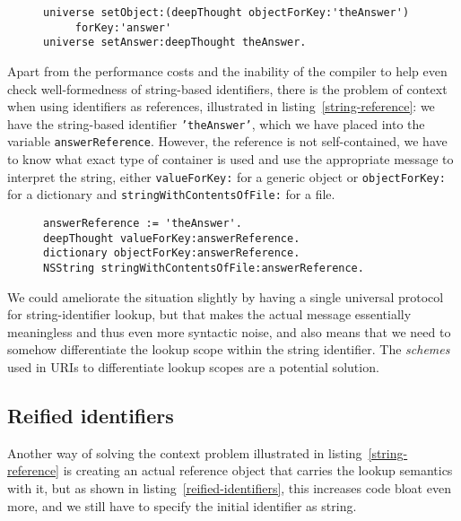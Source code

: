 \documentclass[preprint,authoryear]{acm_proc_article-sp}
\begin{document}
\begin{figure}[htbp]
\begin{lstlisting}[style=numbers,label=string-bloat,caption=Bloat with keyed access.]
universe setObject:(deepThought objectForKey:'theAnswer')
	 forKey:'answer'
universe setAnswer:deepThought theAnswer.
\end{lstlisting}
\end{figure}

Apart from the performance costs and the inability of the compiler to help
even check well-formedness of string-based identifiers, there is the problem
of context when using identifiers as references, illustrated in listing~\ref{string-reference}:
we have the string-based identifier {\tt 'theAnswer'}, which we have placed into the
variable {\tt answerReference}.   However, the reference is not self-contained, we
have to know what exact type of container is used and use the appropriate message
to interpret the string, either {\tt valueForKey:} for a generic object or {\tt objectForKey:}
for a dictionary and {\tt stringWithContentsOfFile:} for a file.


\begin{figure}[htbp]
\begin{lstlisting}[style=numbers,label=string-reference,caption=Indeterminate references.]
answerReference := 'theAnswer'.
deepThought valueForKey:answerReference.
dictionary objectForKey:answerReference.
NSString stringWithContentsOfFile:answerReference.
\end{lstlisting}
\end{figure}

We could ameliorate the situation slightly by having a single universal protocol
for string-identifier lookup, but that makes the actual message essentially
meaningless and thus even more syntactic noise, and also means that we need
to somehow differentiate the lookup scope within the string identifier.   The
{\em schemes} used in URIs to differentiate lookup scopes are a potential
solution.


\subsection{Reified identifiers}


Another way of solving the context problem illustrated in listing~\ref{string-reference} 
is creating an actual reference object that carries the lookup
semantics with it, but as shown in listing~\ref{reified-identifiers},
this increases code bloat even more, and we still have to specify the initial identifier as string.
\end{document}

